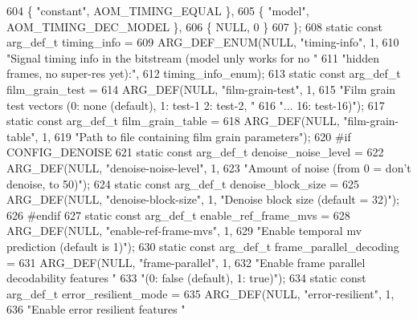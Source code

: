 \begin{DoxyCodeInclude}
{{{{{{{604   \{ \textcolor{stringliteral}{"constant"}, AOM\_TIMING\_EQUAL \},
605   \{ \textcolor{stringliteral}{"model"}, AOM\_TIMING\_DEC\_MODEL \},
606   \{ NULL, 0 \}
607 \};
608 \textcolor{keyword}{static} \textcolor{keyword}{const} arg\_def\_t timing\_info =
609     ARG\_DEF\_ENUM(NULL, \textcolor{stringliteral}{"timing-info"}, 1,
610                  \textcolor{stringliteral}{"Signal timing info in the bitstream (model unly works for no "}
611                  \textcolor{stringliteral}{"hidden frames, no super-res yet):"},
612                  timing\_info\_enum);
613 \textcolor{keyword}{static} \textcolor{keyword}{const} arg\_def\_t film\_grain\_test =
614     ARG\_DEF(NULL, \textcolor{stringliteral}{"film-grain-test"}, 1,
615             \textcolor{stringliteral}{"Film grain test vectors (0: none (default), 1: test-1  2: test-2, "}
616             \textcolor{stringliteral}{"... 16: test-16)"});
617 \textcolor{keyword}{static} \textcolor{keyword}{const} arg\_def\_t film\_grain\_table =
618     ARG\_DEF(NULL, \textcolor{stringliteral}{"film-grain-table"}, 1,
619             \textcolor{stringliteral}{"Path to file containing film grain parameters"});
620 \textcolor{preprocessor}{#if CONFIG\_DENOISE}
621 \textcolor{keyword}{static} \textcolor{keyword}{const} arg\_def\_t denoise\_noise\_level =
622     ARG\_DEF(NULL, \textcolor{stringliteral}{"denoise-noise-level"}, 1,
623             \textcolor{stringliteral}{"Amount of noise (from 0 = don't denoise, to 50)"});
624 \textcolor{keyword}{static} \textcolor{keyword}{const} arg\_def\_t denoise\_block\_size =
625     ARG\_DEF(NULL, \textcolor{stringliteral}{"denoise-block-size"}, 1, \textcolor{stringliteral}{"Denoise block size (default = 32)"});
626 \textcolor{preprocessor}{#endif}
627 \textcolor{keyword}{static} \textcolor{keyword}{const} arg\_def\_t enable\_ref\_frame\_mvs =
628     ARG\_DEF(NULL, \textcolor{stringliteral}{"enable-ref-frame-mvs"}, 1,
629             \textcolor{stringliteral}{"Enable temporal mv prediction (default is 1)"});
630 \textcolor{keyword}{static} \textcolor{keyword}{const} arg\_def\_t frame\_parallel\_decoding =
631     ARG\_DEF(NULL, \textcolor{stringliteral}{"frame-parallel"}, 1,
632             \textcolor{stringliteral}{"Enable frame parallel decodability features "}
633             \textcolor{stringliteral}{"(0: false (default), 1: true)"});
634 \textcolor{keyword}{static} \textcolor{keyword}{const} arg\_def\_t error\_resilient\_mode =
635     ARG\_DEF(NULL, \textcolor{stringliteral}{"error-resilient"}, 1,
636             \textcolor{stringliteral}{"Enable error resilient features "}
}}}}}}}
\end{DoxyCodeInclude}
